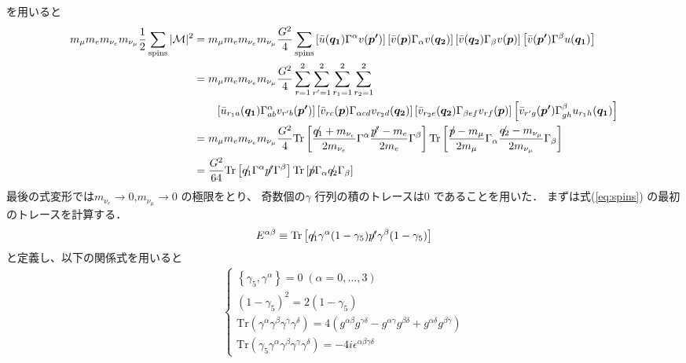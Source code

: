 を用いると
%
\begin{align}
m_{\mu}m_{e}m_{\nu_{e}}m_{\nu_{\mu}}\frac{1}{2}\sum_\mathrm{spins}|\mathcal{M}|^{2}
&=m_{\mu}m_{e}m_{\nu_{e}}m_{\nu_{\mu}}\frac{G^{2}}{4}\sum_\mathrm{spins}\left[\Bar{u}(\bm{q_{1}})\Gamma^{\alpha}v(\bm{p'})\right]\left[\Bar{v}(\bm{p})\Gamma_{\alpha}v(\bm{q_{2}})\right]
\left[\Bar{v}(\bm{q_{2}})\Gamma_{\beta}v(\bm{p})\right]\left[\Bar{v}(\bm{p'})\Gamma^{\beta}u(\bm{q_{1}})\right]\notag\\
&=m_{\mu}m_{e}m_{\nu_{e}}m_{\nu_{\mu}}\frac{G^{2}}{4}\sum_{r=1}^2\sum_{r'=1}^2\sum_{r_1=1}^2\sum_{r_2=1}^2\notag\\
&\qquad\left[\Bar{u}_{r_{1}a}(\bm{q_{1}})\Gamma_{ab}^{\alpha}v_{r'b}(\bm{p'})\right]\left[\Bar{v}_{rc}(\bm{p})\Gamma_{\alpha cd}v_{r_{2}d}(\bm{q_{2}})\right]
\left[\Bar{v}_{r_{2}e}(\bm{q_{2}})\Gamma_{\beta ef}v_{rf}(\bm{p})\right]\left[\Bar{v}_{r'g}(\bm{p'})\Gamma_{gh}^{\beta}u_{r_{1}h}(\bm{q_{1}})\right]\notag\\
&=m_{\mu}m_{e}m_{\nu_{e}}m_{\nu_{\mu}}\frac{G^{2}}{4}\mathrm{Tr}\left[\frac{\Slash{q_{1}}+m_{\nu_{e}}}{2m_{\nu_{e}}}\Gamma^{\alpha}\frac{\Slash{p'}-m_{e}}{2m_{e}}\Gamma^{\beta}\right]
\mathrm{Tr}\left[\frac{\Slash{p}-m_{\mu}}{2m_{\mu}}\Gamma_{\alpha}\frac{\Slash{q_{2}}-m_{\nu_{\mu}}}{2m_{\nu_{\mu}}}\Gamma_{\beta}\right]\notag\\
&=\frac{G^{2}}{64}\mathrm{Tr}\left[\Slash{q_{1}}\Gamma^{\alpha}\Slash{p'}\Gamma^{\beta}\right]\mathrm{Tr}\left[\Slash{p}\Gamma_{\alpha}\Slash{q_{2}}\Gamma_{\beta}\right]\label{eq:spins}
\end{align}
%
最後の式変形では$m_{\nu_{e}}\rightarrow 0$,$m_{\nu_{\mu}}\rightarrow 0$ の極限をとり、
奇数個の$\gamma$ 行列の積のトレースは0 であることを用いた．
まずは式(\ref{eq:spins}) の最初のトレースを計算する．
%
\begin{align}
E^{\alpha\beta}\equiv \mathrm{Tr}\left[\Slash{q_{1}}\gamma^{\alpha}(1 - \gamma_{5})\Slash{p'}\gamma^{\beta}(1 - \gamma_{5})\right]
\end{align}
%
と定義し、以下の関係式を用いると
%
\begin{align*}
  \left\{
    \begin{array}{l}
      \left\{\gamma_{5},\gamma^{\alpha}\right\}=0\;(\alpha=0,\dots,3) \\
      (1-\gamma_{5})^{2}=2(1-\gamma_{5}) \\
      \mathrm{Tr}(\gamma^{\alpha}\gamma^{\beta}\gamma^{\gamma}\gamma^{\delta})=4(g^{\alpha\beta}g^{\gamma\delta}-g^{\alpha\gamma}g^{\beta\delta}+g^{\alpha\delta}g^{\beta\gamma}) \\
      \mathrm{Tr}(\gamma_{5}\gamma^{\alpha}\gamma^{\beta}\gamma^{\gamma}\gamma^{\delta})=-4i\epsilon^{\alpha\beta\gamma\delta}
    \end{array}
  \right.
\end{align*}
